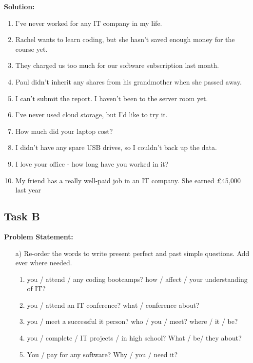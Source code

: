 \documentclass[a4paper,12pt]{article}
\begin{document}
\textbf{Solution:}

\begin{enumerate}
        \item I've never worked for any IT company in my life.
        \item Rachel wants to learn coding, but she hasn't saved enough money for the course yet.
        \item They charged us too much for our software subscription last month.
        \item Paul didn't inherit any shares from his grandmother when she passed away.
        \item I can't submit the report. I haven't been to the server room yet.
        \item I've never used cloud storage, but I'd like to try it.
        \item How much did your laptop cost?
        \item I didn't have any spare USB drives, so I couldn't back up the data.
        \item I love your office - how long have you worked in it?
        \item My friend has a really well-paid job in an IT company. She earned £45,000 last year
    \end{enumerate}
    
\vspace{1cm}

\subsection{Task B}
\textbf{Problem Statement:}
\begin{itemize}
    \item[a)] Re-order the words to write present perfect and past simple questions. Add ever where needed.
        \begin{enumerate}
            \item you / attend / any coding bootcamps? how / affect / your understanding of IT?
            \item you / attend an IT conference? what / conference about?
            \item you / meet a successful it person? who / you / meet? where / it / be?
            \item you / complete / IT projects / in high school? What / be/ they about?
            \item You / pay for any software? Why / you / need it?            
        \end{enumerate}
\end{itemize}
\end{document}
